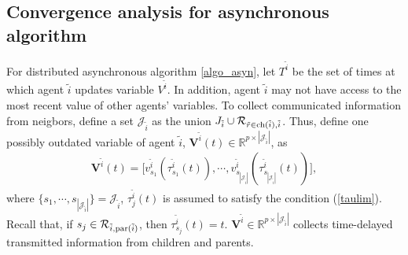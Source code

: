\documentclass[journal]{IEEEtran}
\begin{document}
\subsection{Convergence analysis for asynchronous algorithm }\label{ASM_sec}
\par {For distributed asynchronous algorithm \ref{algo_asyn}}, let $T^{\tilde{i}}$ be the set of times at which agent $\tilde{i}$ updates variable $V^{\tilde{i}}$. In addition, agent $\tilde{i}$ may not have access to the most recent value of other agents' variables. To collect communicated information from neigbors, define a set $\mathcal{J}_{\tilde{i}}$ as the union $J_{\tilde{i}}\cup \mathcal{R}_{\tilde{r}\in {\rm ch}(\tilde{i}),\tilde{i}}$. Thus, define one possibly outdated variable of agent $\tilde{i}$, {$\mathbf{V}^{\tilde{i}}(t)\in \mathbb{R}^{p\times |\mathcal{J}_{\tilde{i}}|}$}, as
\begin{align}\label{Vi_def}
\mathbf{V}^{\tilde{i}}(t)=\big[v_{s_1}^{\tilde{i}}(\tau_{s_1}^{\tilde{i}}(t)),\cdots,v_{s_{|\mathcal{J}_{\tilde{i}}|}}^{\tilde{i}}(\tau_{s_{|\mathcal{J}_{\tilde{i}}|}}^{\tilde{i}}(t))\big],
\end{align}
where $\{s_1,\cdots,s_{|\mathcal{J}_{\tilde{i}}|}\}=\mathcal{J}_{\tilde{i}}$, $\tau_{{j}}^{\tilde{i}}(t)$ is assumed to satisfy the condition (\ref{taulim}). Recall that, if $s_j\in \mathcal{R}_{\tilde{i},{\rm par}(\tilde{i})}$, then $\tau_{s_j}^{\tilde{i}}(t)=t$. $\mathbf{V}^{\tilde{i}}\in \mathbb{R}^{p\times |\mathcal{J}_{\tilde{i}}|}$ collects time-delayed transmitted information from children and parents. %
\end{document}
